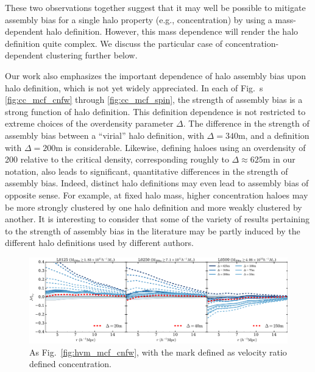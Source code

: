 \documentclass[usenatbib,fleqn]{mnras}
\begin{document}
These two observations together suggest that it may well be possible to mitigate assembly bias for a single halo property (e.g., concentration) by using a mass-dependent halo definition. However, this mass dependence will render the halo definition quite complex. We discuss the particular case of concentration-dependent clustering further below.

Our work also emphasizes the important dependence of halo assembly bias upon halo definition, which is not yet widely appreciated. In each of Fig.~s \ref{fig:cc_mcf_cnfw} through \ref{fig:cc_mcf_spin}, the strength of assembly bias is a strong function of halo definition. This definition dependence is not restricted to extreme choices of the overdensity parameter $\Delta$. The difference in the strength of assembly bias between a ``virial'' halo definition, with $\Delta=340$m, and a definition with $\Delta=200$m is considerable. Likewise, defining haloes using an overdensity of 200 relative to the critical density, corresponding roughly to $\Delta \approx 625$m in our notation, also leads to significant, quantitative differences in the strength of assembly bias. Indeed, distinct halo definitions may even lead to assembly bias of opposite sense. For example, at fixed halo mass, higher concentration haloes may be more strongly clustered by one halo definition and more weakly clustered by another. It is interesting to consider that some of the variety of results pertaining to the strength of assembly bias in the literature may be partly induced by the different halo definitions used by different authors.

\begin{figure}
	\centering
	\includegraphics[width=\textwidth]{match_mcf_cV.pdf}
	\caption{As Fig.~\ref{fig:hvm_mcf_cnfw}, with the mark defined as velocity ratio defined concentration.
}
	\label{fig:hvm_mcf_cV}
\end{figure}
\end{document}
